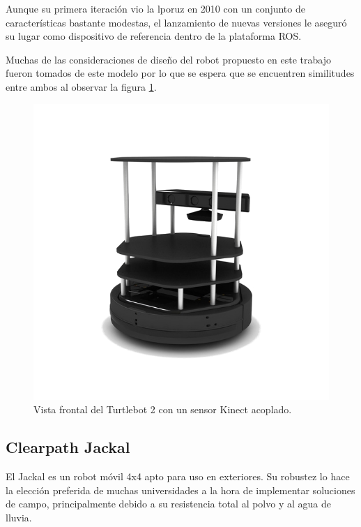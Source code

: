 Aunque su primera iteración vio la lporuz en 2010 con un conjunto de características bastante modestas, el lanzamiento de nuevas versiones le aseguró su lugar como dispositivo de referencia dentro de la plataforma ROS.

Muchas de las consideraciones de diseño del robot propuesto en este trabajo fueron tomados de este modelo por lo que se espera que se encuentren similitudes entre ambos al observar la figura \ref{fig:robotTurtlebot}.

\begin{figure}[ht]
	\centering
	\includegraphics[scale=1.05]{./Figures/turtlebot.png}
	\caption{Vista frontal del Turtlebot 2 con un sensor Kinect acoplado\protect\footnotemark.}
	\label{fig:robotTurtlebot}
\end{figure}


\subsection{Clearpath Jackal}

El Jackal es un robot móvil 4x4 apto para uso en exteriores. Su robustez lo hace la elección preferida de muchas universidades a la hora de implementar soluciones de campo, principalmente debido a su resistencia total al polvo y al agua de lluvia.

